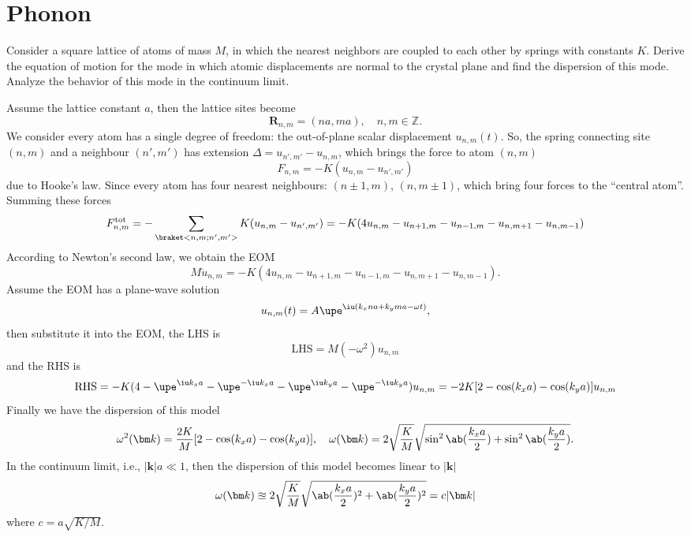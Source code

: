 
\section{Phonon}

\begin{problem}
  Consider a square lattice of atoms of mass $M$,
  in which the nearest neighbors are coupled to each other
  by springs with constants $K$.
  Derive the equation of motion for the mode in which
  atomic displacements are normal to the crystal plane and
  find the dispersion of this mode.
  Analyze the behavior of this mode in the continuum limit.
\end{problem}
\begin{solution}
  Assume the lattice constant $a$, then the lattice sites become
  \[
    \bm R_{n,m} = (na,ma), \quad n, m \in \mathbb Z.
  \]
  We consider every atom has a single degree of freedom: the out-of-plane scalar displacement $u_{n,m}(t)$. So, the spring connecting site $(n,m)$ and a neighbour $(n',m')$ has extension $\Delta = u_{n',m'} - u_{n,m}$, which brings the force to atom $(n,m)$
  \[
    F_{n,m} = -K(u_{n,m} - u_{n',m'})
  \]
  due to Hooke's law. Since every atom has four nearest neighbours:
  $(n \pm 1, m)$, $(n, m \pm 1)$, which bring four forces to the ``central atom''.
  Summing these forces
  \[
    F_{n,m}^\text{tot} = -\sum_{\braket<n,m;n',m'>} K(u_{n,m} - u_{n',m'})
  = -K(4u_{n,m} - u_{n+1,m} - u_{n-1,m} - u_{n,m+1} - u_{n,m-1})
  \]
  According to Newton's second law, we obtain the EOM
  \[
    M\ddot u_{n,m} = -K(4u_{n,m} - u_{n+1,m} - u_{n-1,m} - u_{n,m+1} - u_{n,m-1}).
  \]
  Assume the EOM has a plane-wave solution
  \[
    u_{n,m}(t) = A\upe^{\iu(k_xna+k_yma-\omega t)},
  \]
  then substitute it into the EOM, the LHS is
  \[
    \text{LHS} = M(-\omega^2)u_{n,m}
  \]
  and the RHS is
  \[
    \text{RHS} = -K(4 - \upe^{\iu k_xa} - \upe^{-\iu k_xa}
                      - \upe^{\iu k_ya} - \upe^{-\iu k_ya}) u_{n,m}
  = -2K[2 - \cos(k_xa) - \cos(k_ya)] u_{n,m}
  \]
  Finally we have the dispersion of this model
  \[
    \omega^2(\bm k) = \frac{2K}{M}[2 - \cos(k_xa) - \cos(k_ya)],\quad
    \omega(\bm k) = 2\sqrt{\frac KM} \sqrt{\sin^2\ab(\frac{k_xa}2) + \sin^2\ab(\frac{k_ya}2)}.
  \]
  In the continuum limit, i.e., $|\bm k|a \ll 1$,
  then the dispersion of this model becomes linear to $|\bm k|$
  \[
    \omega(\bm k) \approxeq
    2\sqrt{\frac KM} \sqrt{\ab(\frac{k_xa}2)^2 + \ab(\frac{k_ya}2)^2}
  = c|\bm k|
  \]
  where $c = a\sqrt{K/M}$.
\end{solution}

